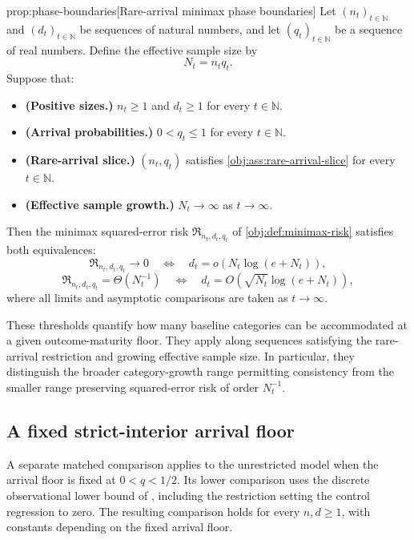 \documentclass[11pt]{article}
\begin{document}
\begin{propositionv}{prop:phase-boundaries}[Rare-arrival minimax phase boundaries]
Let \((n_t)_{t\in\mathbb N}\) and \((d_t)_{t\in\mathbb N}\) be sequences of natural numbers, and let \((q_t)_{t\in\mathbb N}\) be a sequence of real numbers. Define the effective sample size by
\[
N_t=n_tq_t.
\]
Suppose that:
\begin{itemize}
\item \textbf{(Positive sizes.)} \(n_t\ge 1\) and \(d_t\ge 1\) for every \(t\in\mathbb N\).
\item \textbf{(Arrival probabilities.)} \(0<q_t\le 1\) for every \(t\in\mathbb N\).
\item \textbf{(Rare-arrival slice.)} \((n_t,q_t)\) satisfies \cref{obj:ass:rare-arrival-slice} for every \(t\in\mathbb N\).
\item \textbf{(Effective sample growth.)} \(N_t\to\infty\) as \(t\to\infty\).
\end{itemize}
Then the minimax squared-error risk \(\mathfrak R_{n_t,d_t,q_t}\) of \cref{obj:def:minimax-risk} satisfies both equivalences:
\[
\mathfrak R_{n_t,d_t,q_t}\longrightarrow 0
\quad\Longleftrightarrow\quad
d_t=o\!\left(N_t\log(e+N_t)\right),
\]
\[
\mathfrak R_{n_t,d_t,q_t}=\Theta\!\left(N_t^{-1}\right)
\quad\Longleftrightarrow\quad
d_t=O\!\left(\sqrt{N_t}\log(e+N_t)\right),
\]
where all limits and asymptotic comparisons are taken as \(t\to\infty\).
\end{propositionv}

These thresholds quantify how many baseline categories can be accommodated at a given outcome-maturity floor. They apply along sequences satisfying the rare-arrival restriction and growing effective sample size. In particular, they distinguish the broader category-growth range permitting consistency from the smaller range preserving squared-error risk of order \(N_t^{-1}\).

\subsection{A fixed strict-interior arrival floor}

A separate matched comparison applies to the unrestricted model when the arrival floor is fixed at \(0<q<1/2\). Its lower comparison uses the discrete observational lower bound of \citet[Theorem~2, Section~3.2, p.~9, and its proof in Section~C.5, pp.~39--44]{ZengBalakrishnanHanKennedy2026}, including the restriction setting the control regression to zero. The resulting comparison holds for every \(n,d\ge1\), with constants depending on the fixed arrival floor.
\end{document}
